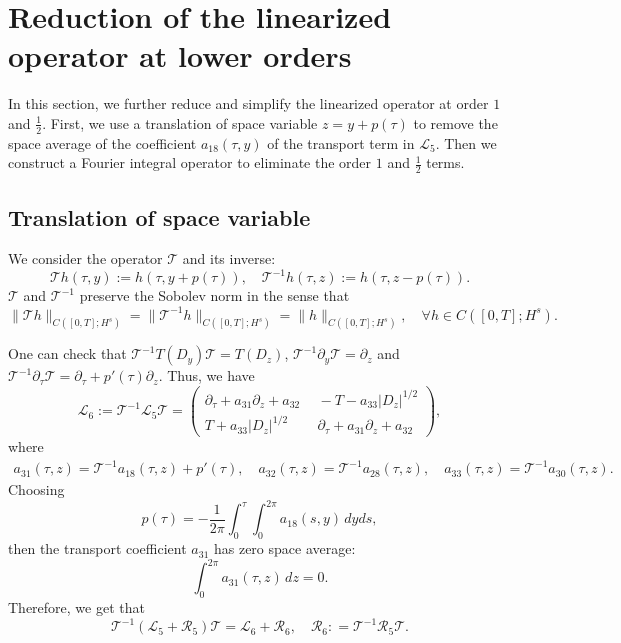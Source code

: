 \documentclass[12pt]{amsart}
\theoremstyle{remark}
\theoremstyle{definition}
\numberwithin{equation}{section}
\newcommand{\p}{\partial}
\newcommand{\f}{\frac}
\newcommand{\mL}{\mathcal{L}}
\newcommand{\mR}{\mathcal{R}}
\newcommand{\inv}{^{-1}}
\begin{document}
\section{Reduction of the linearized operator at lower orders} \label{s:Lower}
In this section, we further reduce and simplify the linearized operator at order $1$ and $\f12$.
First, we use a translation of space variable $z = y + p(\tau)$ to remove the space average of the coefficient $a_{18}(\tau, y)$ of the transport term in $\mL_5$.
Then we construct a Fourier integral operator to eliminate the order $1$ and $\f12$ terms.
\subsection{Translation of space variable}
We consider the operator $\mathcal{T}$ and its inverse:
\begin{equation} \label{mTDef}
\mathcal{T} h(\tau,y):=h(\tau,y+p(\tau)),\quad \mathcal{T} ^{-1} h(\tau,z):=h(\tau,z-p(\tau)).
\end{equation}
$\mathcal{T}$ and $\mathcal{T}^{-1}$ preserve the Sobolev norm in the sense that
\begin{equation} \label{TTInverseBound}
 \|\mathcal{T}h \|_{C([0,T]; H^s)} = \|\mathcal{T}^{-1}h \|_{C([0,T]; H^s)} = \|h \|_{C([0,T]; H^s)}, \quad \forall h \in C([0,T]; H^s).
\end{equation}


One can check that $\mathcal{T}^{-1}T(D_y)\mathcal{T}=T(D_z)$, $\mathcal{T}^{-1}\p_y\mathcal{T}=\p_z$ and $\mathcal{T}^{-1}\p_\tau\mathcal{T}=\p_\tau+p'(\tau)\p_z$. Thus, we have
\begin{equation*}
\mL_6:=\mathcal{T}^{-1}\mL_5 \mathcal{T}
=\begin{pmatrix}
 \p_\tau + a_{31}\p_z + a_{32}  \  & \ -T -a_{33} |D_z|^{1/2} \\ 
T  + a_{33}|D_z|^{1/2}\ & \  \p_\tau + a_{31} \p_z+ a_{32}
\end{pmatrix},
\end{equation*}
where 
\begin{align*}
a_{31}(\tau,z)=\mathcal{T}^{-1}a_{18}(\tau,z)+p'(\tau),\quad a_{32}(\tau,z)=\mathcal{T}^{-1}a_{28}(\tau,z),\quad a_{33}(\tau,z)=\mathcal{T}^{-1}a_{30}(\tau,z).
\end{align*}
Choosing 
\begin{equation*}
p(\tau)=-\f{1}{2\pi}\int_0^\tau\int_0^{2\pi}a_{18}(s,y)\,dyds,
\end{equation*}
then the transport coefficient $a_{31}$ has zero space average:
\begin{equation*}
\int_0^{2\pi}a_{31}(\tau,z)\,dz=0.
\end{equation*}
Therefore, we get that
\begin{equation} \label{TLFiveConjugation}
\mathcal{T}\inv (\mL_5 + \mR_5) \mathcal{T}
= \mL_6 + \mR_6, \quad \mR_6 : =  \mathcal{T}\inv \mR_5 \mathcal{T}.
\end{equation}
\end{document}
